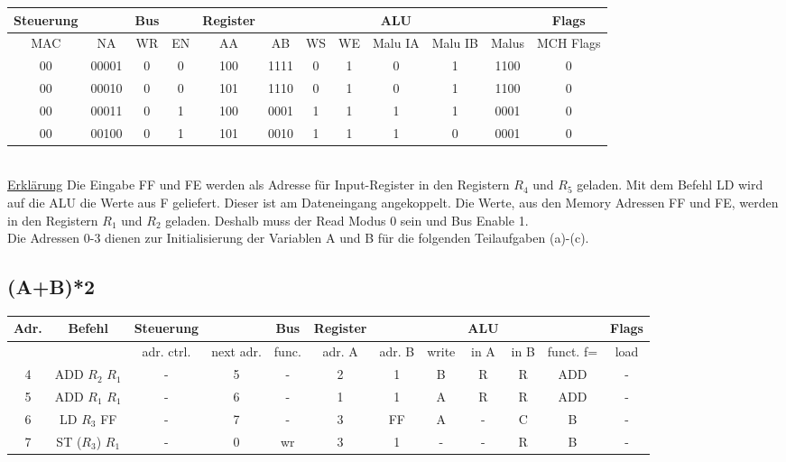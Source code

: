 \documentclass[paper=a4, fontsize=11pt]{scrartcl}
\numberwithin{equation}{section}
\numberwithin{figure}{section}
\numberwithin{table}{section}
\begin{document}
\begin{tabular}{|cc|cc|cccc|ccc|c|}
\hline
Steuerung & & Bus & & Register & & & & ALU & & & Flags \\
\hline
MAC & NA & WR & EN & AA & AB & WS & WE & Malu IA & Malu IB & Malus & MCH Flags \\
\hline
00 & 00001 & 0 & 0 & 100 & 1111 & 0 & 1 & 0 & 1 & 1100 & 0  \\
\hline
00 & 00010 & 0 & 0 & 101 & 1110 & 0 & 1 & 0 & 1 & 1100 & 0 \\
\hline
00 & 00011 & 0 & 1 & 100 & 0001 & 1 & 1 & 1 & 1 & 0001 & 0 \\
\hline
00 & 00100 & 0 & 1 & 101 & 0010 & 1 & 1 & 1 & 0 & 0001 & 0 \\
\hline
\end{tabular} \\

\underline{Erklärung}
Die Eingabe FF und FE werden als Adresse für Input-Register in den Registern $R_{4}$ und $R_{5}$ geladen. Mit dem Befehl LD wird auf die ALU die Werte aus F geliefert. Dieser ist am Dateneingang angekoppelt. Die Werte, aus den Memory Adressen FF und FE, werden in den Registern $R_{1}$ und $R_{2}$ geladen. Deshalb muss der Read Modus 0 sein und Bus Enable 1. \\

Die Adressen 0-3 dienen zur Initialisierung der Variablen A und B für die folgenden Teilaufgaben (a)-(c).


\subsection{(A+B)*2}

\begin{tabular}{|c|c|cc|c|ccc|ccc|c|}
\hline
Adr. & Befehl &Steuerung & & Bus & Register & & & ALU & & & Flags \\
\hline
& & adr. ctrl. & next adr. & func. & adr. A & adr. B & write & in A & in B & funct. f= & load \\
\hline
4 & ADD $R_{2}$ $R_{1}$ & - & 5 & - & 2 & 1 & B & R & R & ADD & - \\
\hline
5 & ADD $R_{1}$ $R_{1}$ & - & 6 & - & 1 & 1 & A & R & R & ADD & - \\
\hline
6 & LD $R_{3}$ FF & - & 7 & - & 3 & FF & A & - & C & B & - \\
\hline
7 & ST ($R_{3}$) $R_{1}$ & - & 0 & wr & 3 & 1 & - & - & R & B  & - \\
\hline
\end{tabular} \\
\end{document}
